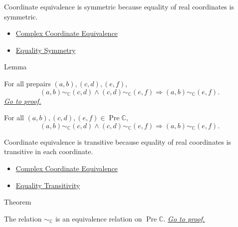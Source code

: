 \begin{remark*}[Interpretation]
Coordinate equivalence is symmetric because equality of real coordinates is
symmetric.
\end{remark*}

\begin{dependencies}
\begin{itemize}
  \item \hyperref[def:complex-coordinate-equivalence]{Complex Coordinate Equivalence}
  \item \hyperref[thm:equality-symmetry]{Equality Symmetry}
\end{itemize}
\end{dependencies}

\begin{lemmabox}{Lemma}
\begin{lemma}
\label{lem:complex-coordinate-equivalence-transitive}
For all prepairs $(a,b),(c,d),(e,f)$,
\[
(a,b)\sim_{\mathbb{C}}(c,d)\land
(c,d)\sim_{\mathbb{C}}(e,f)
\Longrightarrow
(a,b)\sim_{\mathbb{C}}(e,f).
\]
\hyperref[prf:complex-coordinate-equivalence-transitive]{\textit{Go to proof.}}
\end{lemma}
\end{lemmabox}

\begin{remark*}
For all $(a,b),(c,d),(e,f)\in\operatorname{Pre}\mathbb{C}$,
\[
(a,b)\sim_{\mathbb{C}}(c,d)\land
(c,d)\sim_{\mathbb{C}}(e,f)
\Longrightarrow
(a,b)\sim_{\mathbb{C}}(e,f).
\]
\end{remark*}

\begin{remark*}[Interpretation]
Coordinate equivalence is transitive because equality of real coordinates is
transitive in each coordinate.
\end{remark*}

\begin{dependencies}
\begin{itemize}
  \item \hyperref[def:complex-coordinate-equivalence]{Complex Coordinate Equivalence}
  \item \hyperref[thm:equality-transitivity]{Equality Transitivity}
\end{itemize}
\end{dependencies}

\begin{theorembox}{Theorem}
\begin{theorem}
\label{thm:complex-coordinate-equivalence-relation}
The relation $\sim_{\mathbb{C}}$ is an equivalence relation on
\(\operatorname{Pre}\mathbb{C}\).
\hyperref[prf:complex-coordinate-equivalence-relation]{\textit{Go to proof.}}
\end{theorem}
\end{theorembox}

